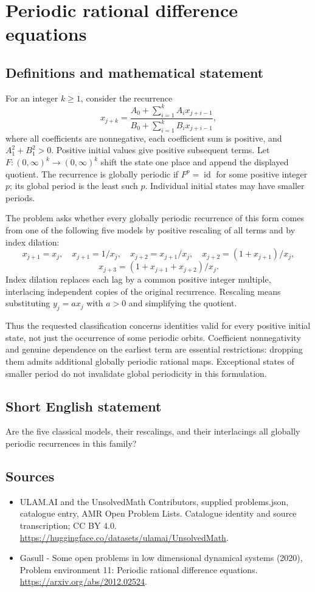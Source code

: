\documentclass[11pt,a4paper]{article}
\begin{document}
\section*{Periodic rational difference equations}\label{statement}

\subsection{Definitions and mathematical statement}
For an integer $k\ge1$, consider the recurrence
\[
 x_{j+k}=\frac{A_0+\sum_{i=1}^k A_i x_{j+i-1}}
                  {B_0+\sum_{i=1}^k B_i x_{j+i-1}},
\]
where all coefficients are nonnegative, each coefficient sum is positive,
and $A_1^2+B_1^2>0$. Positive initial values give positive subsequent terms.
Let $F:(0,\infty)^k\to(0,\infty)^k$ shift the state one place and append
the displayed quotient. The recurrence is globally periodic if
$F^p=\operatorname{id}$ for some positive integer $p$; its global period is
the least such $p$. Individual initial states may have smaller periods.

The problem asks whether every globally periodic recurrence of this form
comes from one of the following five models by positive rescaling of all
terms and by index dilation:
\[
 x_{j+1}=x_j,\quad x_{j+1}=1/x_j,\quad
 x_{j+2}=x_{j+1}/x_j,\quad x_{j+2}=(1+x_{j+1})/x_j,
\]
\[
 x_{j+3}=(1+x_{j+1}+x_{j+2})/x_j.
\]
Index dilation replaces each lag by a common positive integer multiple,
interlacing independent copies of the original recurrence. Rescaling means
substituting $y_j=a x_j$ with $a>0$ and simplifying the quotient.

Thus the requested classification concerns identities valid for every
positive initial state, not just the occurrence of some periodic orbits.
Coefficient nonnegativity and genuine dependence on the earliest term are
essential restrictions: dropping them admits additional globally periodic
rational maps. Exceptional states of smaller period do not invalidate
global periodicity in this formulation.
\subsection{Short English statement}
Are the five classical models, their rescalings, and their interlacings all globally periodic recurrences in this family?
\subsection{Sources}
\begin{itemize}
\item[S1] ULAM.AI and the UnsolvedMath Contributors, supplied problems.json, catalogue entry, AMR Open Problem Lists. Catalogue identity and source transcription; CC BY 4.0.
\url{https://huggingface.co/datasets/ulamai/UnsolvedMath}.
\item[S2] Gasull - Some open problems in low dimensional dynamical systems (2020), Problem environment 11: Periodic rational difference equations. 
\url{https://arxiv.org/abs/2012.02524}.
\end{itemize}
\end{document}

